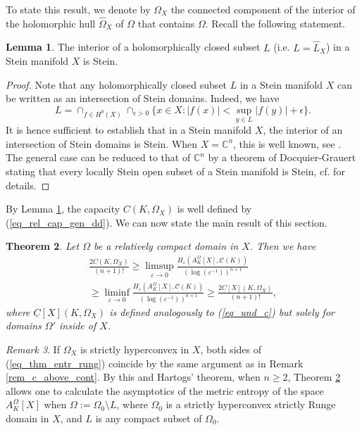 \documentclass[12pt]{article}
\numberwithin{equation}{section}
\theoremstyle{theorem}
\newtheorem{thm}{Theorem}[section]
\theoremstyle{definition}
\newtheorem{lem}[thm]{Lemma}
\theoremstyle{remark}
\newtheorem{rem}[thm]{Remark}
\newcommand{\comp}{\mathbb{C}}
\begin{document}
	To state this result, we denote by $\Omega_X$ the connected component of the interior of the holomorphic hull $\widehat{\Omega}_X$ of $\Omega$ that contains $\Omega$.
	Recall the following statement.
	\begin{lem}\label{lem_interior}
		The interior of a holomorphically closed subset $L$ (i.e. $L = \widehat{L}_X$) in a Stein manifold $X$ is Stein.
	\end{lem}
	\begin{proof}
		Note that any holomorphically closed subset $L$ in a Stein manifold $X$ can be written as an intersection of Stein domains.
		Indeed, we have
		\begin{equation}
			L = \cap_{f \in H^0(X)} \cap_{\epsilon > 0} \Big\{ x \in X : |f(x)| < \sup_{y \in L} |f(y)| + \epsilon \Big\}.
		\end{equation}
		It is hence sufficient to establish that in a Stein manifold $X$, the interior of an intersection of Stein domains is Stein.
		When $X = \comp^n$, this is well known, see \cite[Theorem 2.5.5 and Corollary 2.5.7]{Hormander}. 
		The general case can be reduced to that of $\comp^n$ by a theorem of Docquier-Grauert \cite{DocquierGrauert} stating that every locally Stein open subset of a Stein manifold is Stein, cf. \cite[Theorem 4.3]{SiuPseudoconvBull} for details.
	\end{proof}
	By Lemma \ref{lem_interior}, the capacity $C(K, \Omega_X)$ is well defined by (\ref{eq_rel_cap_gen_dd}).
	We can now state the main result of this section.
	\begin{thm}\label{thm_entr_rung}
		Let $\Omega$ be a relatively compact domain in $X$. Then we have
		\begin{multline}\label{eq_thm_entr_rung}
			\frac{2 C(K, \Omega_X)}{(n + 1)!}
			\geq
			\limsup_{\varepsilon \to 0}
			\frac{H_{\varepsilon}(A_K^{\Omega}[X], \mathscr{C}(K))}{(\log(\varepsilon^{-1}))^{n + 1}}
			\\
			\geq
			\liminf_{\varepsilon \to 0}
			\frac{H_{\varepsilon}(A_K^{\Omega}[X], \mathscr{C}(K))}{(\log(\varepsilon^{-1}))^{n + 1}}
			\geq
			\frac{2 \underline{C}[X](K, \Omega_X)}{(n + 1)!},
		\end{multline}
		where $\underline{C}[X](K, \Omega_X)$ is defined analogously to (\ref{eq_und_c}) but solely for domains $\Omega'$ inside of $X$.
	\end{thm}
	\begin{rem}
		If $\Omega_X$ is strictly hyperconvex in $X$, both sides of (\ref{eq_thm_entr_rung}) coincide by the same argument as in Remark \ref{rem_c_above_cont}. 
		By this and Hartogs' theorem, when $n \geq 2$, Theorem \ref{thm_entr_rung} allows one to calculate the asymptotics of the metric entropy of the space $A_K^{\Omega}[X]$ when $\Omega := \Omega_0 \setminus L$, where $\Omega_0$ is a strictly hyperconvex strictly Runge domain in $X$, and $L$ is any compact subset of $\Omega_0$. 
	\end{rem}
\end{document}
